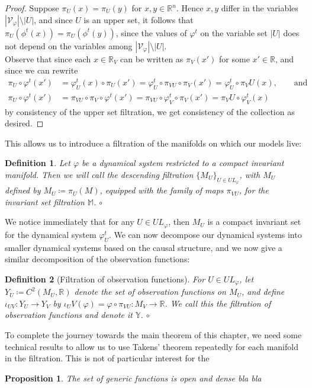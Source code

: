 \documentclass[11pt, a4paper]{memoir}
\theoremstyle{break}
\newtheorem{prop}{Proposition}
\theoremstyle{break}
\newtheorem{innerdefn}{Definition}
\newenvironment{defn}
  {\begin{innerdefn}}
  {\ensuremath{\circ}\end{innerdefn}}
\theoremstyle{nonumberplain}
\newtheorem{proof}{Proof}
\newcommand{\mR}{\mathbb{R}}
\begin{document}
\begin{proof}
Suppose $\pi_U(x)=\pi_U(y)$ for $x,y\in \mR^n$. Hence $x,y$ differ in the variables $|\mathcal{V}_\varphi|\setminus |U|$, and since $U$ is an upper set, it follows that $\pi_U(\phi^t(x))=\pi_U(\phi^t(y))$, since the values of $\varphi^t$ on the variable set $|U|$ does not depend on the variables  among $|\mathcal{V}_\varphi|\setminus |U|$.\\
Observe that since each $x\in \mR_V$ can be written as $\pi_V(x')$ for some $x'\in \mR$, and since we can rewrite
\begin{align*}
\pi_U\circ\varphi^t(x')
&=\varphi_U^t(x)\circ\pi_U(x')=
\varphi_U^t\circ\pi_{VU}\circ\pi_V(x')=\varphi_U^t\circ\pi_VU(x),\quad\quad \text{and}\\
\pi_U\circ\varphi^t(x')&=\pi_{VU}\circ \pi_V\circ\varphi^t(x')=\pi_{VU}\circ \varphi_V^t\circ \pi_V(x')=\pi_VU\circ\varphi_V^t(x)
\end{align*}
by consistency of the upper set filtration, we get consistency of the collection as desired.
\end{proof}
This allows us to introduce a filtration of the manifolds on which our models live:
\begin{defn}
Let $\varphi$ be a dynamical system restricted to a compact invariant manifold. Then we will call the descending filtration $\{M_U\}_{U\in UL_\varphi}$, with $M_U$ defined by $M_U\coloneqq \pi_U(M)$, equipped with the family of maps $\pi_{VU}$, for the \emph{invariant set filtration} $\mathbb{M}$.
\end{defn}
We notice immediately that for any $U\in UL_\varphi$, then $M_U$ is a compact invariant set for the dynamical system $\varphi^t_U$. We can now decompose our dynamical systems into smaller dynamical systems based on the causal structure, and we now give a similar decomposition of the observation functions:
\begin{defn}[Filtration of observation functions]
For $U\in UL_\varphi$, let $Y_U\coloneqq C^2(M_U,\mR)$ denote the set of observation functions on $M_U$, and define $\iota_{UV}:Y_U\to Y_V$ by $\iota_UV(\varphi)=\varphi\circ \pi_{VU}:M_V\to \mR$. We call this the \emph{filtration of observation functions} and denote it $\mathbb{Y}$.
\end{defn}
To complete the journey towards the main theorem of this chapter, we need some technical results to allow us to use Takens' theorem repeatedly for each manifold in the filtration. This is not of particular interest for the
\begin{prop}
The set of generic functions is open and dense bla bla
\end{prop}
\end{document}
